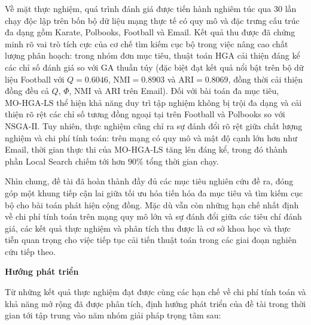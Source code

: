 \documentclass[14pt,a4paper]{extarticle}
\begin{document}
Về mặt thực nghiệm, quá trình đánh giá được tiến hành nghiêm túc qua 30 lần chạy độc lập trên bốn bộ dữ liệu mạng thực tế có quy mô và đặc trưng cấu trúc đa dạng gồm Karate, Polbooks, Football và Email. Kết quả thu được đã chứng minh rõ vai trò tích cực của cơ chế tìm kiếm cục bộ trong việc nâng cao chất lượng phân hoạch: trong nhóm đơn mục tiêu, thuật toán $\text{HGA}$ cải thiện đáng kể các chỉ số đánh giá so với $\text{GA}$ thuần túy (đặc biệt đạt kết quả nổi bật trên bộ dữ liệu Football với $Q = 0.6046$, $\text{NMI} = 0.8903$ và $\text{ARI} = 0.8069$, đồng thời cải thiện đồng đều cả $Q$, $\Phi$, NMI và ARI trên Email). Đối với bài toán đa mục tiêu, $\text{MO-HGA-LS}$ thể hiện khả năng duy trì tập nghiệm không bị trội đa dạng và cải thiện rõ rệt các chỉ số tương đồng ngoại tại trên Football và Polbooks so với $\text{NSGA-II}$. Tuy nhiên, thực nghiệm cũng chỉ ra sự đánh đổi rõ rệt giữa chất lượng nghiệm và chi phí tính toán: trên mạng có quy mô và mật độ cạnh lớn hơn như Email, thời gian thực thi của $\text{MO-HGA-LS}$ tăng lên đáng kể, trong đó thành phần Local Search chiếm tới hơn $90\%$ tổng thời gian chạy.

Nhìn chung, đề tài đã hoàn thành đầy đủ các mục tiêu nghiên cứu đề ra, đóng góp một khung tiếp cận lai giữa tối ưu hóa tiến hóa đa mục tiêu và tìm kiếm cục bộ cho bài toán phát hiện cộng đồng. Mặc dù vẫn còn những hạn chế nhất định về chi phí tính toán trên mạng quy mô lớn và sự đánh đổi giữa các tiêu chí đánh giá, các kết quả thực nghiệm và phân tích thu được là cơ sở khoa học và thực tiễn quan trọng cho việc tiếp tục cải tiến thuật toán trong các giai đoạn nghiên cứu tiếp theo.

\newpage
\begin{center}
\textbf{\fontsize{20}{24}\selectfont
Hướng phát triển}
\end{center}

Từ những kết quả thực nghiệm đạt được cùng các hạn chế về chi phí tính toán và khả năng mở rộng đã được phân tích, định hướng phát triển của đề tài trong thời gian tới tập trung vào năm nhóm giải pháp trọng tâm sau:
\end{document}
